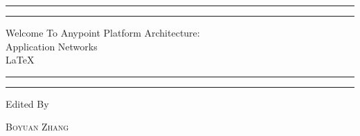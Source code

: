 \begin{titlepage} %

 \centering %

 \scshape %

 \vspace*{\baselineskip} %


 \rule{\textwidth}{1.6pt}\vspace*{-\baselineskip}\vspace*{2pt} %
 \rule{\textwidth}{0.4pt} %

 \vspace{0.75\baselineskip} %

 {\LARGE Welcome To Anypoint Platform Architecture: \\
 		Application Networks \\ \small\LaTeX ~} %

 \vspace{0.75\baselineskip} %

 \rule{\textwidth}{0.4pt}\vspace*{-\baselineskip}\vspace{3.2pt} %
 \rule{\textwidth}{1.6pt} %

 \vspace{2\baselineskip} %



 \vspace*{3\baselineskip} %


 Edited By

 \vspace{0.5\baselineskip} %

 {\scshape\Large Boyuan Zhang \\} %


\end{titlepage}
